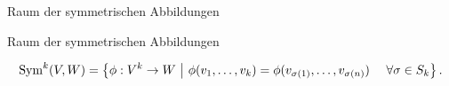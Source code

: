 \documentclass[class=article, crop=false]{standalone}
\begin{document}
\begin{zettel}{Raum der symmetrischen Abbildungen}
\begin{flashcard}[kale0m09]{Raum der symmetrischen Abbildungen}
	\begin{definition}
		\[
			\Sym^k (V,W ) = \set{\phi : V^k \to  W}{\phi (v_1, \dots,v_k) = \phi (v_{\sigma(1)}, \dots , v_{\sigma(n)}) \quad \forall \sigma \in  S_k}
		.\]
	\end{definition}
\end{flashcard}
\end{zettel}
\end{document}
